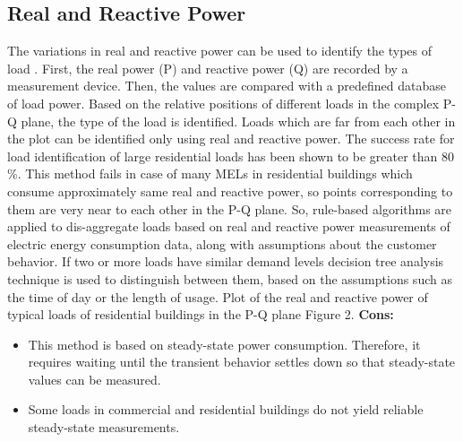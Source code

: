 \documentclass[11pt, a4paper]{article} %
\begin{document}
\subsection{Real and Reactive Power}
The variations in real and reactive power can be used to identify the types of load \cite{97667}. First, the real power (P) and reactive power (Q) are recorded by a measurement device. Then, the values are compared with a predefined database of load power. Based on the relative positions of different loads in the complex P-Q plane, the type of the load is identified. Loads which are far from each other in the plot can be identified only using real and reactive power. The success rate for load identification of large residential loads has been shown to be greater than 80 \%.
This method fails in case of many MELs in residential buildings which consume approximately same real and reactive power, so points corresponding to them are very near to each other in the P-Q plane. So, rule-based algorithms are applied to dis-aggregate loads based on real and reactive power measurements of electric energy consumption data, along with assumptions about the customer behavior. If two or more loads have similar demand levels decision tree analysis technique is used to distinguish between them, based on the assumptions such as the time of day or the length of usage.
Plot of the real and reactive power of typical loads of residential buildings in the P-Q plane \cite{192069} Figure 2.
\newline
\textbf{Cons:}
\begin{itemize}
    \item This method is based on steady-state power consumption. Therefore, it requires waiting until the transient behavior settles down so that steady-state values can be measured.
    \item Some loads in commercial and residential buildings do not yield reliable steady-state measurements.
\end{itemize}
\end{document}
